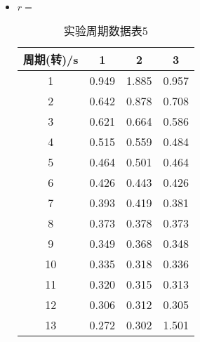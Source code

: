\documentclass[12pt,hyperref,a4paper,UTF8]{ctexart}
\begin{document}
\begin{itemize}
            \item $r=$
            \begin{table}[h!]
                \centering
                \begin{tabular}{cccc}
                \toprule
                \textbf{周期(转)/s} & \textbf{1} & \textbf{2} & \textbf{3} \\
                \midrule
                1  & 0.949 & 1.885 & 0.957 \\
                2  & 0.642 & 0.878 & 0.708 \\
                3  & 0.621 & 0.664 & 0.586 \\
                4  & 0.515 & 0.559 & 0.484 \\
                5  & 0.464 & 0.501 & 0.464 \\
                6  & 0.426 & 0.443 & 0.426 \\
                7  & 0.393 & 0.419 & 0.381 \\
                8  & 0.373 & 0.378 & 0.373 \\
                9  & 0.349 & 0.368 & 0.348 \\
                10 & 0.335 & 0.318 & 0.336 \\
                11 & 0.320 & 0.315 & 0.313 \\
                12 & 0.306 & 0.312 & 0.305 \\
                13 & 0.272 & 0.302 & 1.501 \\
                \bottomrule
                \end{tabular}
                \caption{实验周期数据表5}
                \end{table}
                
    \end{itemize}
\end{document}
